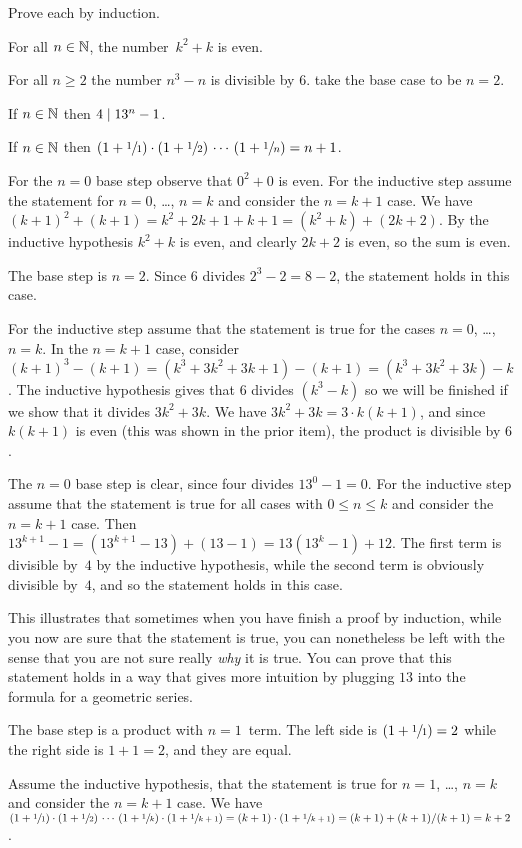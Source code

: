\documentclass{ibl}  %
\begin{document}
\begin{ex}
Prove each by induction.
\begin{exes}
\item For all $n\in\mathbb{N}$, the number~$k^2+k$ is even.
\item For all $n\geq 2$ the number $n^3-n$ is divisible by $6$.
  \hint take the base case to be $n=2$.
\item If $n\in\mathbb{N}$ then $4\mid 13^n-1$.
\item If $n\in\mathbb{N}$ then
    $(1+\sfrac{1}{1})\cdot(1+\sfrac{1}{2})\,\cdots\,(1+\sfrac{1}{n})=n+1$.
\end{exes}
\begin{ans}
\begin{exes}
\item For the $n=0$ base step observe that $0^2+0$ is even.
  For the inductive step assume the statement for $n=0$, \ldots, $n=k$
  and consider the $n=k+1$ case.
  We have $(k+1)^2+(k+1)=k^2+2k+1+k+1=(k^2+k)+(2k+2)$. 
  By the inductive hypothesis $k^2+k$ is even, and clearly $2k+2$ is even, 
  so the sum is even.
\item The base step is $n=2$.
  Since $6$ divides $2^3-2=8-2$, the statement holds in this case.

  For the inductive step assume that the statement is true for 
  the cases $n=0$, \ldots, $n=k$.
  In the $n=k+1$ case, consider 
  $(k+1)^3-(k+1)=(k^3+3k^2+3k+1)-(k+1)=(k^3+3k^2+3k)-k$.
  The inductive hypothesis gives that $6$ divides $(k^3-k)$ so we will
  be finished if we show that it divides  $3k^2+3k$.
  We have $3k^2+3k=3\cdot k(k+1)$, and since
  $k(k+1)$ is even (this was shown in the prior item),
  the product is divisible by $6$.  
\item The $n=0$ base step is clear, since four divides $13^0-1=0$.
  For the inductive step assume that the statement is true for all cases 
  with $0\leq n\leq k$ and consider the $n=k+1$ case.
  Then $13^{k+1}-1=(13^{k+1}-13)+(13-1)=13(13^k-1)+12$.
  The first term is divisible by~$4$ by the inductive hypothesis, while the
  second term is obviously divisible by~$4$, and so the statement holds in 
  this case.

  \remark
  This illustrates that 
  sometimes when you have finish a proof by induction, 
  while you now are sure that the statement is true, 
  you can nonetheless be left with the sense
  that you are not sure really \emph{why} it is true.
  You can prove that this statement holds in a 
  way that gives more intuition by plugging $13$ into the formula for a
  geometric series. 
\item The base step is a product with $n=1$~term.
  The left side is $(1+\sfrac{1}{1})=2$ while the right side is $1+1=2$,
  and they are equal.

  Assume the inductive hypothesis, that the statement is true for
  $n=1$, \ldots, $n=k$ and consider the $n=k+1$ case.
  We have
  $(1+\sfrac{1}{1})\cdot(1+\sfrac{1}{2})\,\cdots\,(1+\sfrac{1}{k})\cdot(1+\sfrac{1}{k+1})
  =
  (k+1)\cdot(1+\sfrac{1}{k+1})
  =(k+1)+(k+1)/(k+1)
  =k+2$.
\end{exes}
\end{ans}
\end{ex}
\end{document}
